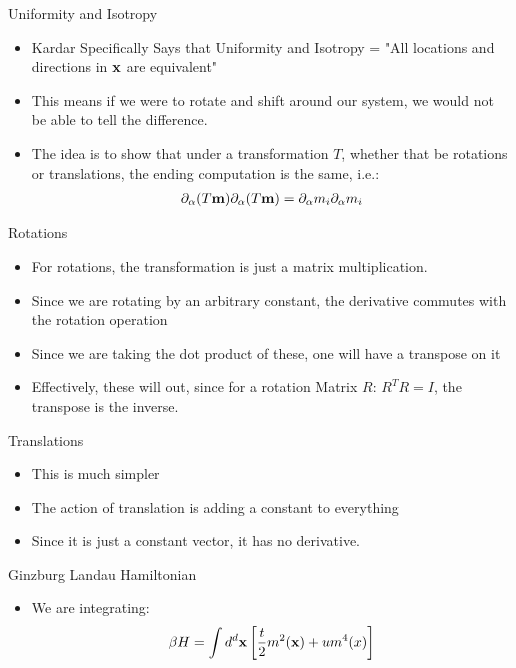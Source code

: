 \documentclass{beamer}
\begin{document}
\begin{frame}{Uniformity and Isotropy}
  \begin{itemize}
  \item Kardar Specifically Says that Uniformity and Isotropy = "All locations and directions in $\vb{x}$ are equivalent"
  \item This means if we were to rotate and shift around our system, we would not be able to tell the difference.
  \item The idea is to show that under a transformation $T$, whether that be rotations or translations, the ending computation is the same, i.e.:
    \begin{align*}
      \partial_\alpha (T\vb{m})\partial_\alpha(T \vb{m})=
      \partial_\alpha m_i\partial_\alpha m_i
    \end{align*}
  \end{itemize}
\end{frame}
\begin{frame}{Rotations}
  \begin{itemize}
  \item For rotations, the transformation is just a matrix multiplication.
  \item Since we are rotating by an arbitrary constant, the derivative commutes with the rotation operation
  \item Since we are taking the dot product of these, one will have a transpose on it
  \item Effectively, these will out, since for a rotation Matrix $R$: $R^TR=I$, the transpose is the inverse. 
    
  \end{itemize}
\end{frame}

\begin{frame}{Translations}
  \begin{itemize}
  \item This is much simpler
  \item The action of translation is adding a constant to everything
  \item Since it is just a constant vector, it has no derivative.
  \end{itemize}
\end{frame}

\begin{frame}{Ginzburg Landau Hamiltonian}
  \begin{itemize}
  \item We are integrating:
    \begin{align*}
      \beta H=\int\dd[d]{\vb{x}}\qty[\frac{t}{2}m^2(\vb{x})+um^4(x)]
    \end{align*}
  \end{itemize}
\end{frame}
\end{document}
